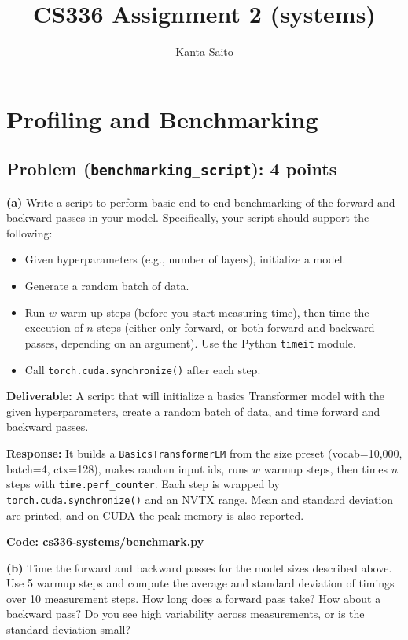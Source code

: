 \documentclass[11pt]{article}
\title{CS336 Assignment 2 (systems)}
\author{Kanta Saito}
\date{}
\begin{document}
\maketitle

\section{Profiling and Benchmarking}

\subsection*{Problem (\texttt{benchmarking\_script}): 4 points}

\textbf{(a)} Write a script to perform basic end-to-end benchmarking of the forward and backward passes in your model. Specifically, your script should support the following:
\begin{itemize}
    \item Given hyperparameters (e.g., number of layers), initialize a model.
    \item Generate a random batch of data.
    \item Run $w$ warm-up steps (before you start measuring time), then time the execution of $n$ steps (either only forward, or both forward and backward passes, depending on an argument). Use the Python \texttt{timeit} module.
    \item Call \texttt{torch.cuda.synchronize()} after each step.
\end{itemize}
\textbf{Deliverable:} A script that will initialize a basics Transformer model with the given hyperparameters, create a random batch of data, and time forward and backward passes.

\vspace{0.25cm}
\textbf{Response:}
It builds a \texttt{BasicsTransformerLM} from the size preset (vocab=10{,}000, batch=4, ctx=128), makes random input ids, runs $w$ warmup steps, then times $n$ steps with \texttt{time.perf\_counter}. Each step is wrapped by \texttt{torch.cuda.synchronize()} and an NVTX range. Mean and standard deviation are printed, and on CUDA the peak memory is also reported.

\textbf{Code: cs336-systems/benchmark.py}

\vspace{0.25cm}
\textbf{(b)} Time the forward and backward passes for the model sizes described above. Use 5 warmup steps and compute the average and standard deviation of timings over 10 measurement steps. How long does a forward pass take? How about a backward pass? Do you see high variability across measurements, or is the standard deviation small?
\end{document}
